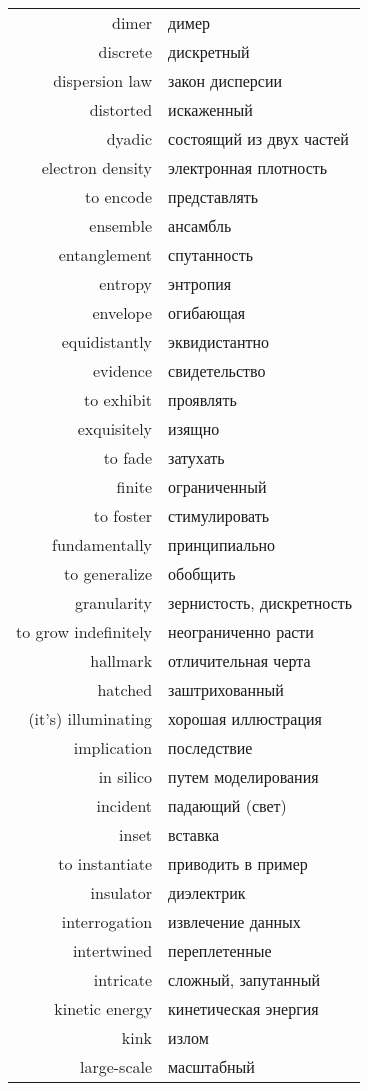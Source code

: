 \documentclass[a4paper, 14pt]{extarticle}
\begin{document}
\begin{longtable}{r@{ -- }l}
	dimer & димер \\
	discrete & дискретный \\
	dispersion law & закон дисперсии \\
	distorted & искаженный \\
	dyadic & состоящий из двух частей \\
	electron density & электронная плотность \\
	to encode & представлять \\
	ensemble & ансамбль \\
	entanglement & спутанность \\
	entropy & энтропия \\
	envelope & огибающая \\
	equidistantly & эквидистантно \\
	evidence & свидетельство \\
	to exhibit & проявлять \\
	exquisitely & изящно \\
	to fade & затухать \\
	finite & ограниченный \\
	to foster & стимулировать \\
	fundamentally & принципиально \\
	to generalize & обобщить \\
	granularity & зернистость, дискретность \\
	to grow indefinitely & неограниченно расти \\
	hallmark & отличительная черта \\
	hatched & заштрихованный \\
	(it's) illuminating & хорошая иллюстрация \\
	implication & последствие \\
	in silico & путем моделирования \\
	incident & падающий (свет) \\
	inset & вставка \\
	to instantiate & приводить в пример \\
	insulator & диэлектрик \\
	interrogation & извлечение данных \\
	intertwined & переплетенные \\
	intricate & сложный, запутанный \\
	kinetic energy & кинетическая энергия \\
	kink & излом \\
	large-scale & масштабный \\

\end{longtable}
\end{document}

